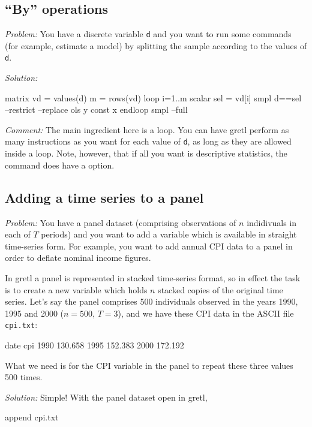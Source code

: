 \subsection{``By'' operations}

\emph{Problem:} You have a discrete variable \texttt{d} and you want
to run some commands (for example, estimate a model) by splitting the
sample according to the values of \texttt{d}.

\emph{Solution:}
\begin{code}
matrix vd = values(d)
m = rows(vd)
loop i=1..m
  scalar sel = vd[i]
  smpl d==sel --restrict --replace
  ols y const x
endloop
smpl --full
\end{code}

\emph{Comment:} The main ingredient here is a loop.  You can have
gretl perform as many instructions as you want for each value of
\texttt{d}, as long as they are allowed inside a loop. Note, however,
that if all you want is descriptive statistics, the 
command does have a  option.

\subsection{Adding a time series to a panel}

\emph{Problem:} You have a panel dataset (comprising observations of
$n$ indidivuals in each of $T$ periods) and you want to add a variable
which is available in straight time-series form.  For example, you
want to add annual CPI data to a panel in order to deflate nominal
income figures.

In gretl a panel is represented in stacked time-series format, so in
effect the task is to create a new variable which holds $n$ stacked
copies of the original time series.  Let's say the panel comprises 500
individuals observed in the years 1990, 1995 and 2000 ($n=500$,
$T=3$), and we have these CPI data in the ASCII file \texttt{cpi.txt}:

\begin{code}
date cpi
1990 130.658
1995 152.383
2000 172.192
\end{code}

What we need is for the CPI variable in the panel to repeat these
three values 500 times.

\emph{Solution:} Simple!  With the panel dataset open in gretl,
\begin{code}
append cpi.txt
\end{code}

